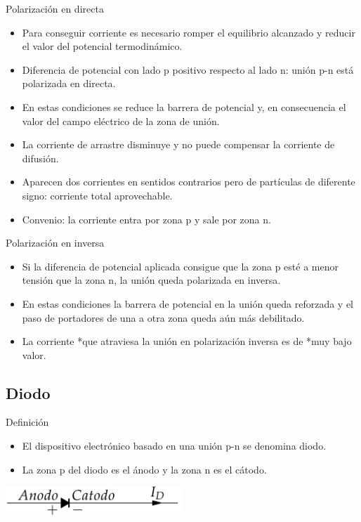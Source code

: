 \documentclass[xcolor={usenames,svgnames,dvipsnames}]{beamer}
\begin{document}
\begin{frame}[label=sec-1-4-4]{Polarización en directa}
\begin{itemize}
\item \alert{Para conseguir corriente es necesario romper el equilibrio alcanzado y reducir el valor del potencial termodinámico}.

\item \alert{Diferencia de potencial} con lado p positivo respecto al lado n: unión p-n está \alert{polarizada en directa}.

\item En estas condiciones \alert{se reduce la barrera de potencial} y, en consecuencia el valor del campo eléctrico de la zona de unión.

\item La \alert{corriente de arrastre disminuye} y \alert{no puede compensar la corriente de difusión}.

\item Aparecen dos corrientes en sentidos contrarios pero de partículas de diferente signo: \alert{corriente total aprovechable.}

\item Convenio: la corriente entra por zona p y sale por zona n.
\end{itemize}
\end{frame}

\begin{frame}[label=sec-1-4-5]{Polarización en inversa}
\begin{itemize}
\item Si la diferencia de potencial aplicada consigue que la zona p esté a
menor tensión que la zona n, la unión queda \alert{polarizada en inversa}.

\item En estas condiciones \alert{la barrera de potencial en la unión queda
reforzada} y el paso de portadores de una a otra zona queda aún más
debilitado.

\item La \alert{corriente *que atraviesa la unión en polarización inversa es de
*muy bajo valor}.
\end{itemize}
\end{frame}

\subsection{Diodo}
\label{sec-1-5}

\begin{frame}[label=sec-1-5-1]{Definición}
\begin{itemize}
\item El dispositivo electrónico basado en una unión p-n se denomina diodo.

\item La zona p del diodo es el ánodo y la zona n es el cátodo.
\end{itemize}
\includegraphics[width=0.5\textwidth]{../figs/Diodo.pdf}
\end{frame}
\end{document}
